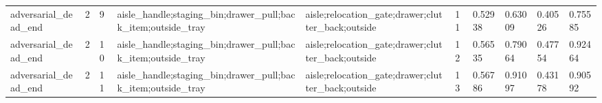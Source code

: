 \documentclass{article}
\begin{document}
\begin{table}[tbp]
{\begin{tabular}{llllllllll}
adversarial\_dead\_end & 2 & 9 & aisle\_handle;staging\_bin;drawer\_pull;back\_item;outside\_tray & aisle;relocation\_gate;drawer;clutter\_back;outside & 11 & 0.52938 & 0.63009 & 0.40526 & 0.75585 \\
adversarial\_dead\_end & 2 & 10 & aisle\_handle;staging\_bin;drawer\_pull;back\_item;outside\_tray & aisle;relocation\_gate;drawer;clutter\_back;outside & 12 & 0.56535 & 0.79064 & 0.47754 & 0.92464 \\
adversarial\_dead\_end & 2 & 11 & aisle\_handle;staging\_bin;drawer\_pull;back\_item;outside\_tray & aisle;relocation\_gate;drawer;clutter\_back;outside & 13 & 0.56786 & 0.91097 & 0.43178 & 0.90592 \\
\bottomrule
\end{tabular}
}
\end{table}

\clearpage
\end{document}
